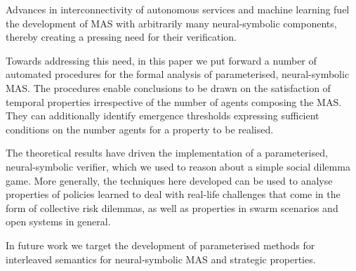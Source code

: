 Advances in interconnectivity of autonomous services and machine learning fuel
the development of MAS with arbitrarily many neural-symbolic components, thereby
creating a pressing need for their verification. 

Towards addressing this need,
in this paper we put forward a number of automated procedures for the formal
analysis of parameterised, neural-symbolic MAS. The procedures enable
conclusions to be drawn on the satisfaction of temporal properties irrespective
of the number of agents composing the MAS. They can additionally identify
emergence thresholds expressing sufficient conditions on the number agents
for a property to be realised.

The theoretical results have driven the implementation of a parameterised,
neural-symbolic verifier, which we used to reason about a simple social dilemma
game. More generally, the techniques here developed  can be used to analyse
properties of policies learned to deal with real-life challenges that come in
the form of collective risk dilemmas, as well as properties in swarm scenarios
and open systems in general.

In future work we target the development of parameterised methods for
interleaved semantics for neural-symbolic MAS and strategic properties.

